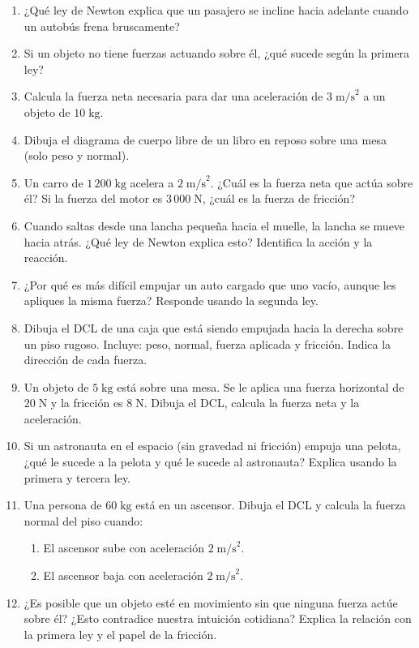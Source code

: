 \documentclass[12pt, letterpaper]{article}
\begin{document}
\begin{enumerate}[leftmargin=*]
  \item \facil{} ¿Qué ley de Newton explica que un pasajero se incline hacia adelante cuando un autobús frena bruscamente?

  \item \facil{} Si un objeto no tiene fuerzas actuando sobre él, ¿qué sucede según la primera ley?

  \item \facil{} Calcula la fuerza neta necesaria para dar una aceleración de $3\;\text{m/s}^2$ a un objeto de $10\;\text{kg}$.

  \item \facil{} Dibuja el diagrama de cuerpo libre de un libro en reposo sobre una mesa (solo peso y normal).

  \item \medio{} Un carro de $1\,200\;\text{kg}$ acelera a $2\;\text{m/s}^2$. ¿Cuál es la fuerza neta que actúa sobre él? Si la fuerza del motor es $3\,000\;\text{N}$, ¿cuál es la fuerza de fricción?

  \item \medio{} Cuando saltas desde una lancha pequeña hacia el muelle, la lancha se mueve hacia atrás. ¿Qué ley de Newton explica esto? Identifica la acción y la reacción.

  \item \medio{} ¿Por qué es más difícil empujar un auto cargado que uno vacío, aunque les apliques la misma fuerza? Responde usando la segunda ley.

  \item \medio{} Dibuja el DCL de una caja que está siendo empujada hacia la derecha sobre un piso rugoso. Incluye: peso, normal, fuerza aplicada y fricción. Indica la dirección de cada fuerza.

  \item \dificil{} Un objeto de $5\;\text{kg}$ está sobre una mesa. Se le aplica una fuerza horizontal de $20\;\text{N}$ y la fricción es $8\;\text{N}$. Dibuja el DCL, calcula la fuerza neta y la aceleración.

  \item \dificil{} Si un astronauta en el espacio (sin gravedad ni fricción) empuja una pelota, ¿qué le sucede a la pelota y qué le sucede al astronauta? Explica usando la primera y tercera ley.

  \item \dificil{} Una persona de $60\;\text{kg}$ está en un ascensor. Dibuja el DCL y calcula la fuerza normal del piso cuando:
        \begin{enumerate}[label=\alph*)]
          \item El ascensor sube con aceleración $2\;\text{m/s}^2$.
          \item El ascensor baja con aceleración $2\;\text{m/s}^2$.
        \end{enumerate}

  \item \dificil{} ¿Es posible que un objeto esté en movimiento sin que ninguna fuerza actúe sobre él? ¿Esto contradice nuestra intuición cotidiana? Explica la relación con la primera ley y el papel de la fricción.
\end{enumerate}
\end{document}
